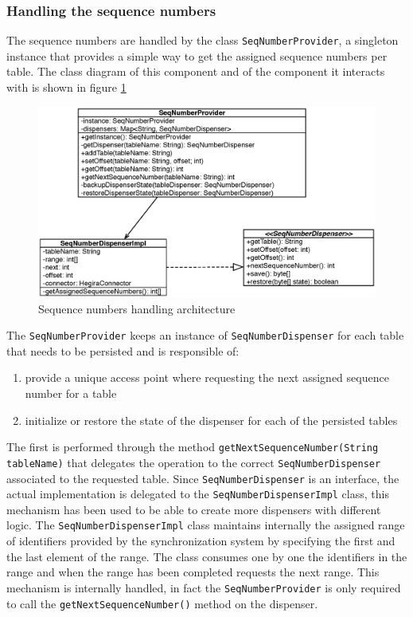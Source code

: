 \subsubsection{Handling the sequence numbers}
The sequence numbers are handled by the class \texttt{SeqNumberProvider}, a singleton instance that provides a simple way to get the assigned sequence numbers per table.
\noindent The class diagram of this component and of the component it interacts with is shown in figure \ref{fig:seq-provider}

\begin{figure}[tbh]
  \centering
  \includegraphics[width=12cm]{images/seq_provider}
  \caption{Sequence numbers handling architecture}
  \label{fig:seq-provider}
\end{figure} 

\noindent The \texttt{SeqNumberProvider} keeps an instance of \texttt{SeqNumberDispenser} for each table that needs to be persisted and is responsible of:
\begin{enumerate}
\item provide a unique access point where requesting the next assigned sequence number for a table
\item initialize or restore the state of the dispenser for each of the persisted tables
\end{enumerate}
\noindent The first is performed through the method \texttt{getNextSequenceNumber(String tableName)} that delegates the operation to the correct \texttt{SeqNumberDispenser} associated to the requested table.
Since \texttt{SeqNumberDispenser} is an interface, the actual implementation is delegated to the \texttt{SeqNumberDispenserImpl} class, this mechanism has been used to be able to create more dispensers with different logic.
\noindent The \texttt{SeqNumberDispenserImpl} class maintains internally the assigned range of identifiers provided by the synchronization system by specifying the first and the last element of the range. The class consumes one by one the identifiers in the range and when the range has been completed requests the next range. This mechanism is internally handled, in fact the \texttt{SeqNumberProvider} is only required to call the \texttt{getNextSequenceNumber()} method on the dispenser.


